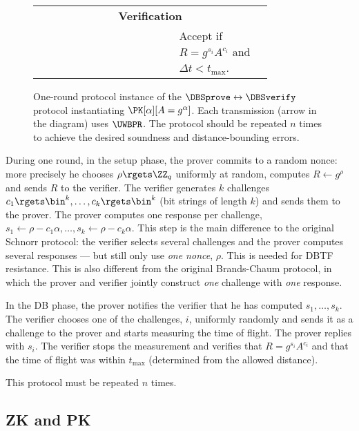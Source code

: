 \begin{figure*}
\begin{tabular}{p{0.40\linewidth}cp{0.40\linewidth}}
    \midrule
    \multicolumn{3}{c}{\textbf{Verification}}
    \\

    &
    & Accept if \(R = g^{s_i} A^{c_i}\) and \(\Delta t < t_{\max}\).
    \\
    
  \end{tabular}
  \caption{%
    One-round protocol instance of the \(\DBSprove\leftrightarrow \DBSverify\) 
    protocol instantiating \(\PK[\alpha][A = g^\alpha]\).
    Each transmission (arrow in the diagram) uses \(\UWBPR\).
    The protocol should be repeated \(n\) times to achieve the desired 
    soundness and distance-bounding errors.
  }%
  \label{SchnorrFigure}
\end{figure*}

During one round, in the setup phase, the prover commits to a random nonce: 
more precisely he chooses \(\rho\rgets \ZZ_q\) uniformly at random, computes 
\(R\gets g^\rho\) and sends \(R\) to the verifier.
The verifier generates \(k\) challenges \(c_1\rgets \bin^k, \dotsc, c_k\rgets 
  \bin^k\) (bit strings of length \(k\)) and sends them to the prover.
The prover computes one response per challenge, \(s_1\gets \rho - c_1\alpha, 
  \dotsc, s_k\gets \rho - c_k\alpha\).
This step is the main difference to the original Schnorr protocol: the verifier 
selects several challenges and the prover computes several responses --- but 
still only use \emph{one nonce}, \(\rho\).
This is needed for \ac{DBTF} resistance.
This is also different from the original Brands-Chaum protocol, in which the 
prover and verifier jointly construct \emph{one} challenge with \emph{one} 
response.

In the \ac{DB} phase, the prover notifies the verifier that he has computed 
\(s_1, \dotsc, s_k\).
The verifier chooses one of the challenges, \(i\), uniformly randomly and sends 
it as a challenge to the prover and starts measuring the time of flight.
The prover replies with \(s_i\).
The verifier stops the measurement and verifies that \(R = g^{s_i}A^{c_i}\) and 
that the time of flight was within \(t_{\max}\) (determined from the allowed 
  distance).

This protocol must be repeated \(n\) times.

\subsection{\Acl*{ZK} and \acl*{PK}}

